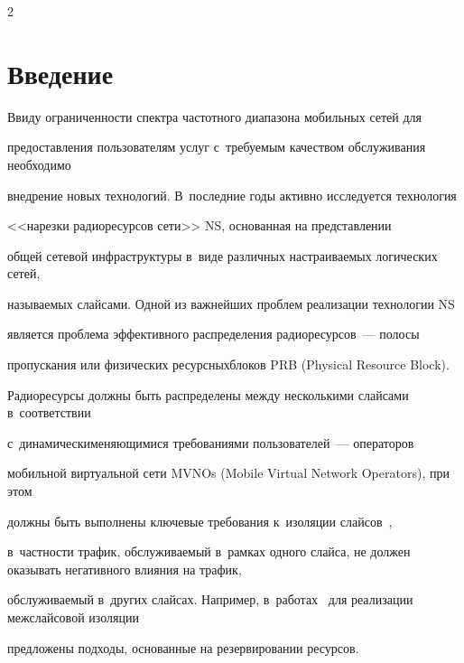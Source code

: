 \begin{multicols}{2}





\label{st\stat}





\section{Введение}





Ввиду ограниченности спектра частотного диапазона мобильных сетей для 


предоставления пользователям услуг с~требуемым качеством обслуживания необходимо 


внедрение новых технологий. В~последние годы активно исследуется технология 


<<нарезки радиоресурсов сети>> NS, основанная на представлении 


общей сетевой инфраструктуры в~виде различных настраиваемых логических сетей, 


называемых слайсами. Одной из \mbox{важнейших} проб\-лем реализации технологии NS 


является проб\-ле\-ма эффективного распределения радиоресурсов~--- полосы 


пропускания или физических ресурсных\linebreak блоков PRB (Physical Resource Block). 


Радиоре\-сурсы должны быть распределены между несколькими слайсами в~соответствии 


с~динамически\linebreak меняющимися требованиями пользователей~--- операторов 


мобильной виртуальной сети MVNOs (Mobile Virtual Network Operators), при этом 


долж\-ны быть выполнены ключевые требования к~изоляции слайсов~\cite{3gpp.21.916, 3gpp.22.864}, 


в~част\-ности трафик, об\-слу\-жи\-ва\-емый в~рамках одного слайса, не должен оказывать негативного влияния на трафик, 


об\-слу\-жи\-ва\-емый в~других слайсах. Например, в~работах~\cite{3gpp.28.554, Yarkina2022} для реализации межслайсовой изоляции 


предложены подходы, основанные на резервировании ресурсов.






\end{multicols}

